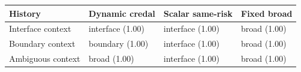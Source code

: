 \begin{tabular}{@{}llll@{}}
\toprule
History & Dynamic credal & Scalar same-risk & Fixed broad\\
\midrule
Interface context & interface (1.00) & interface (1.00) & broad (1.00)\\
Boundary context & boundary (1.00) & interface (1.00) & broad (1.00)\\
Ambiguous context & broad (1.00) & interface (1.00) & broad (1.00)\\
\bottomrule
\end{tabular}
